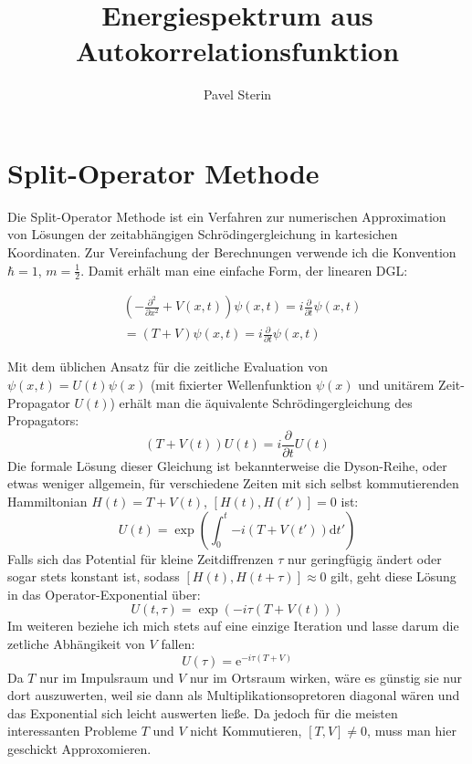 \documentclass[10pt,a4paper,german]{scrartcl}
\title{Energiespektrum aus Autokorrelationsfunktion}
\author{Pavel Sterin}
\begin{document}
	\maketitle
	\section{Split-Operator Methode}
		Die Split-Operator Methode ist ein Verfahren zur numerischen Approximation
		von Lösungen der zeitabhängigen Schrödingergleichung 
		in kartesichen Koordinaten. Zur Vereinfachung
		der Berechnungen verwende ich die Konvention $\hbar = 1$, $m=\frac{1}{2}$.
		Damit erhält man eine einfache Form, der linearen DGL:

		\begin{align*}
				&\left(-\frac{\partial^2}{\partial x^2} + V(x,t)\right)\psi(x,t)
					= i \frac{\partial}{\partial t}\psi(x,t) \\
				&= \left(T + V\right)\psi(x,t)
					= i \frac{\partial}{\partial t}\psi(x,t)
		\end{align*}

		Mit dem üblichen Ansatz für die zeitliche Evaluation von $ \psi(x,t)=U(t)\psi(x) $
		(mit fixierter Wellenfunktion $\psi(x)$ und unitärem Zeit-Propagator $U(t)$)
		erhält man	die äquivalente Schrödingergleichung des Propagators:
		\begin{equation*}
			\left(T + V(t)\right) U(t) = i  \frac{\partial}{\partial t}U(t)
		\end{equation*}
		Die formale Lösung dieser Gleichung ist bekannterweise die Dyson-Reihe, oder etwas
		weniger allgemein, für verschiedene Zeiten mit sich selbst kommutierenden
		Hammiltonian $H(t)=T+V(t)$, $[H(t),H(t')]=0$ ist:
		\begin{equation*}
			U(t)=\exp\left(\int_{0}^{t}{-i (T+V(t')) \mathrm{d} t'}\right)
		\end{equation*}
		Falls sich das Potential für kleine Zeitdiffrenzen $\tau$ nur geringfügig ändert oder
		sogar stets konstant ist, sodass $[H(t),H(t+\tau)]\approx 0$ gilt, geht diese Lösung
		in das Operator-Exponential über:
		\begin{equation*}
			U(t,\tau)=\exp\left(-i \tau (T+V(t))\right)
		\end{equation*}
		Im weiteren beziehe ich mich stets auf eine einzige Iteration und lasse darum die
		zetliche Abhängikeit von $V$ fallen:
		\begin{equation}\label{eq:exp}
			U(\tau)=\mathrm{e}^{-i \tau (T+V)}
		\end{equation}
		Da $T$ nur im Impulsraum und $V$ nur im Ortsraum wirken, wäre es günstig sie
		nur dort auszuwerten, weil sie dann als Multiplikationsopretoren diagonal
		wären und	das Exponential sich leicht auswerten ließe. Da jedoch für die
		meisten interessanten Probleme $T$ und $V$ nicht Kommutieren, $[T,V]\neq 0$,
		muss man hier geschickt	Approxomieren.
\end{document}
